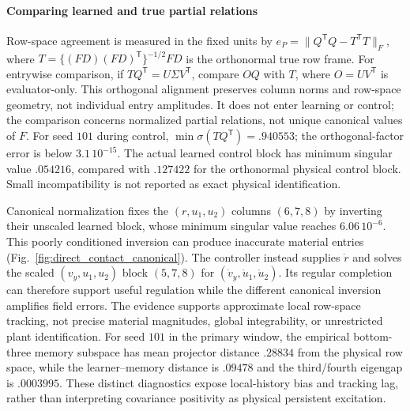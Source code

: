\paragraph{Comparing learned and true partial relations}
Row-space agreement is measured in the fixed units by
$e_P=\|Q^{\mathsf T}Q-T^{\mathsf T}T\|_F$, where
$T=\{(FD)(FD)^{\mathsf T}\}^{-1/2}FD$ is the orthonormal true row frame.
For entrywise comparison, if $TQ^{\mathsf T}=U\Sigma V^{\mathsf T}$,
compare $OQ$ with $T$, where $O=UV^{\mathsf T}$ is evaluator-only.
This orthogonal alignment preserves column norms and row-space geometry,
not individual entry amplitudes. It does not enter learning or control;
the comparison concerns normalized partial relations, not unique canonical
values of $F$. For seed $101$ during control,
$\min\sigma(TQ^{\mathsf T})=.940553$; the orthogonal-factor error is below
$3.1\,10^{-15}$. The actual learned control block has minimum singular value
$.054216$, compared with $.127422$ for the orthonormal physical control block.
Small incompatibility is not reported as exact physical identification.

Canonical normalization fixes the $(r,u_1,u_2)$ columns $(6,7,8)$ by
inverting their unscaled learned block, whose minimum singular value reaches
$6.06\,10^{-6}$. This poorly conditioned inversion can produce inaccurate
material entries (Fig.~\ref{fig:direct_contact_canonical}). The controller
instead supplies $\dot r$ and solves the scaled $(v_y,u_1,u_2)$ block
$(5,7,8)$ for $(\dot v_y,\dot u_1,\dot u_2)$. Its regular completion can
therefore support useful regulation while the different canonical inversion
amplifies field errors. The evidence supports approximate local row-space
tracking, not precise material magnitudes, global integrability, or
unrestricted plant identification.
For seed $101$ in the primary window, the empirical bottom-three memory
subspace has mean projector distance $.28834$ from the physical row space,
while the learner--memory distance is $.09478$ and the third/fourth eigengap
is $.0003995$. These distinct diagnostics expose local-history bias and
tracking lag, rather than interpreting covariance positivity as physical
persistent excitation.

